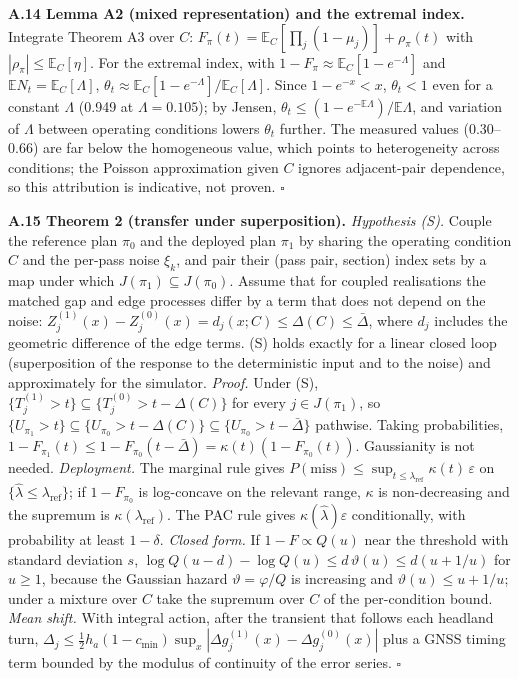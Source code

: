 \documentclass[preprint,12pt,authoryear]{elsarticle}
\begin{document}
\textbf{A.14 Lemma A2 (mixed representation) and the extremal index.} Integrate Theorem A3 over \(C\): \(F_\pi(t)=\mathbb E_C[\prod_j(1-\mu_j)]+\rho_\pi(t)\) with \(|\rho_\pi|\le\mathbb E_C[\eta]\). For the extremal index, with \(1-F_\pi\approx\mathbb E_C[1-e^{-\Lambda}]\) and \(\mathbb EN_t=\mathbb E_C[\Lambda]\), \(\theta_t\approx\mathbb E_C[1-e^{-\Lambda}]/\mathbb E_C[\Lambda]\). Since \(1-e^{-x}<x\), \(\theta_t<1\) even for a constant \(\Lambda\) (0.949 at \(\Lambda=0.105\)); by Jensen, \(\theta_t\le(1-e^{-\mathbb E\Lambda})/\mathbb E\Lambda\), and variation of \(\Lambda\) between operating conditions lowers \(\theta_t\) further. The measured values (0.30--0.66) are far below the homogeneous value, which points to heterogeneity across conditions; the Poisson approximation given \(C\) ignores adjacent-pair dependence, so this attribution is indicative, not proven. \(\square\)

\textbf{A.15 Theorem 2 (transfer under superposition).} \emph{Hypothesis (S).} Couple the reference plan \(\pi_0\) and the deployed plan \(\pi_1\) by sharing the operating condition \(C\) and the per-pass noise \(\xi_k\), and pair their (pass pair, section) index sets by a map under which \(J(\pi_1)\subseteq J(\pi_0)\). Assume that for coupled realisations the matched gap and edge processes differ by a term that does not depend on the noise: \(Z^{(1)}_j(x)-Z^{(0)}_j(x)=d_j(x;C)\le\Delta(C)\le\bar\Delta\), where \(d_j\) includes the geometric difference of the edge terms. (S) holds exactly for a linear closed loop (superposition of the response to the deterministic input and to the noise) and approximately for the simulator. \emph{Proof.} Under (S), \(\{T^{(1)}_j>t\}\subseteq\{T^{(0)}_j>t-\Delta(C)\}\) for every \(j\in J(\pi_1)\), so \(\{U_{\pi_1}>t\}\subseteq\{U_{\pi_0}>t-\Delta(C)\}\subseteq\{U_{\pi_0}>t-\bar\Delta\}\) pathwise. Taking probabilities, \(1-F_{\pi_1}(t)\le1-F_{\pi_0}(t-\bar\Delta)=\kappa(t)(1-F_{\pi_0}(t))\). Gaussianity is not needed. \emph{Deployment.} The marginal rule gives \(P(\text{miss})\le\sup_{t\le\lambda_\mathrm{ref}}\kappa(t)\,\varepsilon\) on \(\{\hat\lambda\le\lambda_\mathrm{ref}\}\); if \(1-F_{\pi_0}\) is log-concave on the relevant range, \(\kappa\) is non-decreasing and the supremum is \(\kappa(\lambda_\mathrm{ref})\). The PAC rule gives \(\kappa(\hat\lambda)\varepsilon\) conditionally, with probability at least \(1-\delta\). \emph{Closed form.} If \(1-F\propto Q(u)\) near the threshold with standard deviation \(s\), \(\log Q(u-d)-\log Q(u)\le d\,\vartheta(u)\le d(u+1/u)\) for \(u\ge1\), because the Gaussian hazard \(\vartheta=\varphi/Q\) is increasing and \(\vartheta(u)\le u+1/u\); under a mixture over \(C\) take the supremum over \(C\) of the per-condition bound. \emph{Mean shift.} With integral action, after the transient that follows each headland turn, \(\Delta_j\le\tfrac12h_a(1-c_{\min})\sup_x|\Delta g^{(1)}_j(x)-\Delta g^{(0)}_j(x)|\) plus a GNSS timing term bounded by the modulus of continuity of the error series. \(\square\)
\end{document}
